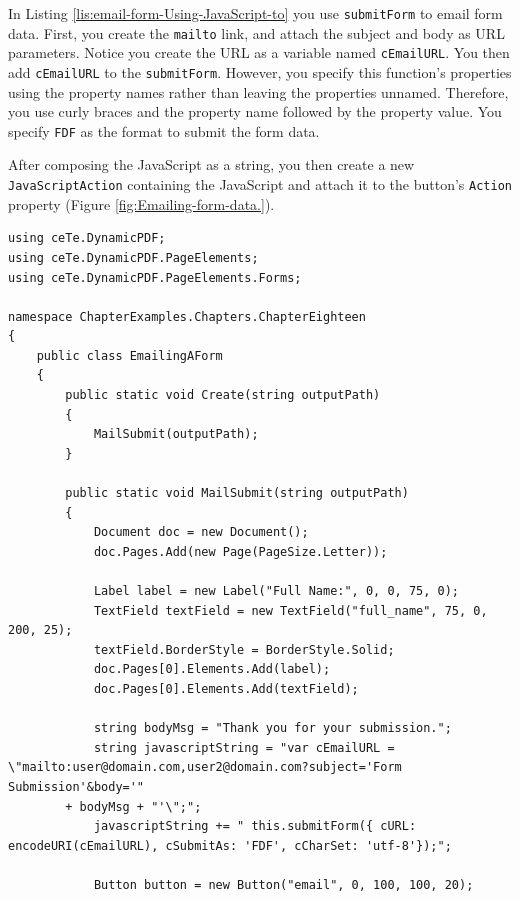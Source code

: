\documentclass[american]{tufte-book}
\numberwithin{equation}{section}
\numberwithin{figure}{section}
\begin{document}
{{In Listing \ref{lis:email-form-Using-JavaScript-to} you use \texttt{submitForm}
to email form data. First, you create the \texttt{mailto} link, and
attach the subject and body as URL parameters. Notice you create the
URL as a variable named \texttt{cEmailURL}. You then add \texttt{cEmailURL}
to the \texttt{submitForm}. However, you specify this function's properties
using the property names rather than leaving the properties unnamed.
Therefore, you use curly braces and the property name followed by the
property value. You specify \texttt{FDF} as the format to submit the
form data. 

After composing the JavaScript as a string, you then create a new \texttt{JavaScriptAction}
containing the JavaScript and attach it to the button's \texttt{Action}
property (Figure \ref{fig:Emailing-form-data.}).

\bgroup{}
\begin{lstlisting}[caption={Using JavaScript to email a form.},label={lis:email-form-Using-JavaScript-to},basicstyle={\footnotesize\ttfamily},breaklines=true]
using ceTe.DynamicPDF;
using ceTe.DynamicPDF.PageElements;
using ceTe.DynamicPDF.PageElements.Forms;

namespace ChapterExamples.Chapters.ChapterEighteen
{
    public class EmailingAForm
    {
        public static void Create(string outputPath)
        {
            MailSubmit(outputPath);  
        }

        public static void MailSubmit(string outputPath)
        {
            Document doc = new Document();
            doc.Pages.Add(new Page(PageSize.Letter));

            Label label = new Label("Full Name:", 0, 0, 75, 0);
            TextField textField = new TextField("full_name", 75, 0, 200, 25);
            textField.BorderStyle = BorderStyle.Solid;
            doc.Pages[0].Elements.Add(label);
            doc.Pages[0].Elements.Add(textField);

            string bodyMsg = "Thank you for your submission.";
            string javascriptString = "var cEmailURL = \"mailto:user@domain.com,user2@domain.com?subject='Form Submission'&body='" 
        + bodyMsg + "'\";";
            javascriptString += " this.submitForm({ cURL: encodeURI(cEmailURL), cSubmitAs: 'FDF', cCharSet: 'utf-8'});";

            Button button = new Button("email", 0, 100, 100, 20);


\end{lstlisting}}}
\end{document}
